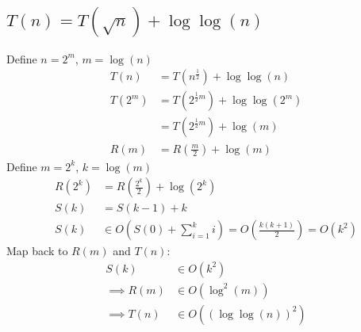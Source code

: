\documentclass{article}
\begin{document}
\subsection{$T(n) = T(\sqrt{n}) + \log\log(n)$}
Define $n = 2^m$, $m = \log(n)$ 
\begin{align*}
    T(n) &= T(n^{\frac{1}{2}}) + \log\log(n)\\
    T(2^m) &= T(2^{\frac{1}{2} m}) + \log\log(2^m)\\
    &= T(2^{\frac{1}{2} m}) + \log(m)\\
    R(m) &= R(\frac{m}{2}) + \log(m)
\end{align*}
Define $m = 2^k$, $k = \log(m)$
\begin{align*}
    R(2^k) &= R(\frac{2^k}{2}) + \log(2^k)\\
    S(k) &= S(k-1) + k\\
    S(k) &\in O(S(0) + \sum_{i=1}^{k} i) = O(\frac{k(k + 1)}{2}) = O(k^2)
\end{align*}
Map back to $R(m)$ and $T(n)$:
\begin{align*}
    S(k) &\in O(k^2)\\
    \implies R(m) &\in O(\log^2(m))\\
    \implies T(n) &\in O((\log\log(n))^2)
\end{align*}
\end{document}
